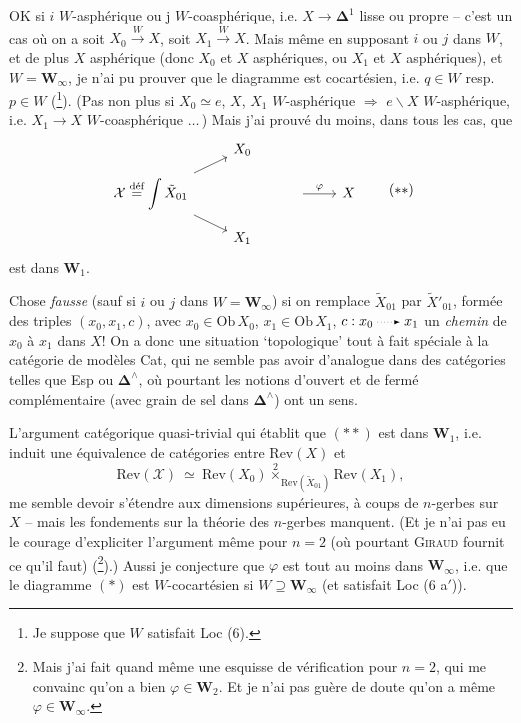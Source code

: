\documentclass[11pt]{article}
\newcommand{\msp}[1]{\marginpar{\footnotesize [#1]}}
\newcommand{\dotto}{\mathrel{\tikz[baseline=-0.5ex]\draw[dotted,-latex] (0,0)--(1.6em,0);}}
\begin{document}
OK si $i$ $W$-asphérique ou j $W$-coasphérique, i.e. $X \longrightarrow \boldsymbol{\Delta}^1$ lisse ou propre -- c'est un cas où on a soit $X_0 \xrightarrow{W} X$, soit $X_1 \xrightarrow{W} X$. Mais même en supposant $i$ ou $j$ dans $W$, et de plus $X$ asphérique (donc $X_0$ et $X$ asphériques, ou $X_1$ et $X$ asphériques), et $W = \mathbf{W}_\infty$, je n'ai pu prouver que le diagramme est cocartésien, i.e. $q \in W$ resp. $p \in W$ (\footnote[9]{Je suppose que $W$ satisfait Loc (6).}). (Pas non plus si $X_0 \simeq e$, $X$, $X_1$ $W$-asphérique $\Longrightarrow$ $e\backslash X$ $W$-asphérique, i.e. $X_1 \longrightarrow X$ $W$-coasphérique $\ldots$\,) Mais j'ai prouvé du moins, dans tous les cas, que %
\[
\begin{tikzcd}[row sep=small]
 & X_0 & & \\
\mathcal{X} \overset{\text{déf}}{=} \displaystyle\int \tilde{X}_{01} \arrow[ur] \arrow[dr] & & {} \arrow[r, "\varphi"] & X \\
 & X_1 & &
\end{tikzcd}
\tag*{$(**)$} %
\]
est dans $\mathbf{W}_1$.

Chose \textit{fausse} (sauf si $i$ ou $j$ dans $W = \mathbf{W}_\infty$) si on remplace $\tilde{X}_{01}$ par $\tilde{X}'_{01}$, formée des triples $(x_0, x_1, c)$, avec $x_0 \in \mathrm{Ob}\,X_0$, $x_1 \in \mathrm{Ob}\,X_1$, $c : x_0 \dotto x_1$ un \textit{chemin} de $x_0$ à $x_1$ dans $X$! On a
\msp{page 18}donc une situation ‘topologique’ tout à fait spéciale à la catégorie de modèles Cat, qui ne semble pas avoir d'analogue dans des catégories telles que Esp ou $\boldsymbol{\Delta}^\wedge$, où pourtant les notions d'ouvert et de fermé complémentaire (avec grain de sel dans $\boldsymbol{\Delta}^\wedge$) ont un sens.

L'argument catégorique quasi-trivial qui établit que $(**)$ est dans $\mathbf{W}_1$, i.e. induit une équivalence de catégories entre $\mathrm{Rev}(X)$ et
\[ \mathrm{Rev}(\mathcal{X}) \ \simeq \ \mathrm{Rev}(X_0) \overset{2}{\times}_{\mathrm{Rev}(\tilde{X}_{01})} \mathrm{Rev}(X_1), \]
me semble devoir s'étendre aux dimensions supérieures, à coups de $n$-gerbes sur $X$ -- mais les fondements sur la théorie des $n$-gerbes manquent. (Et je n'ai pas eu le courage d'expliciter l'argument même pour $n = 2$ (où pourtant \textsc{Giraud} fournit ce qu'il faut) (\footnote[10]{Mais j'ai fait quand même une esquisse de vérification pour $n = 2$, qui me convainc qu'on a bien $\varphi \in \mathbf{W}_2$. Et je n'ai pas guère de doute qu'on a même $\varphi \in \mathbf{W}_\infty$.}).) Aussi je conjecture que $\varphi$ est tout au moins dans $\mathbf{W}_\infty$, i.e. que le diagramme $(*)$ est $W$-cocartésien si $W \supseteq \mathbf{W}_\infty$ (et satisfait Loc (6 a$'$)). %
\end{document}
